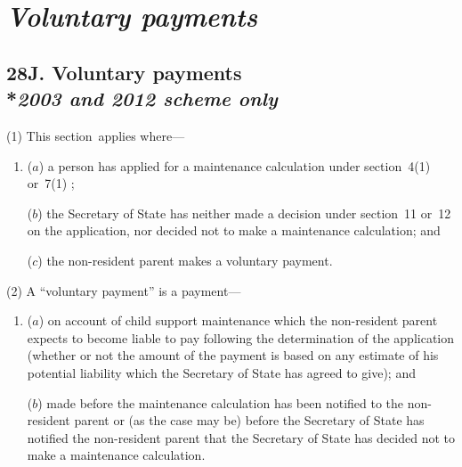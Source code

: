 \documentclass[12pt,a4paper]{article}
\begin{document}


\section{\itshape Voluntary payments}

\subsection[28J. Voluntary payments --- \emph{2003 and 2012 scheme only}]{28J. Voluntary payments\\*\emph{2003 and 2012 scheme only}}

(1) This section~applies where—
\begin{enumerate}\item[]
($a$) a person has applied for a maintenance calculation under section~4(1)  or~7(1)%
;

($b$) the 
Secretary of State  %
has neither made a decision under section~11 or~12 on the application, nor decided not to make a maintenance calculation; and

($c$) the non-resident parent makes a voluntary payment.
\end{enumerate}

(2) A “voluntary payment” is a payment—
\begin{enumerate}\item[]
($a$) on account of child support maintenance which the non-resident parent expects to become liable to pay following the determination of the application (whether or not the amount of the payment is based on any estimate of his potential liability which the 
Secretary of State  %
has agreed to give); and

($b$) made before the maintenance calculation has been notified to the non-resident parent or (as the case may be) before the 
Secretary of State  %
has notified the non-resident parent that 
the Secretary of State  %
has decided not to make a maintenance calculation.
\end{enumerate}
\end{document}
